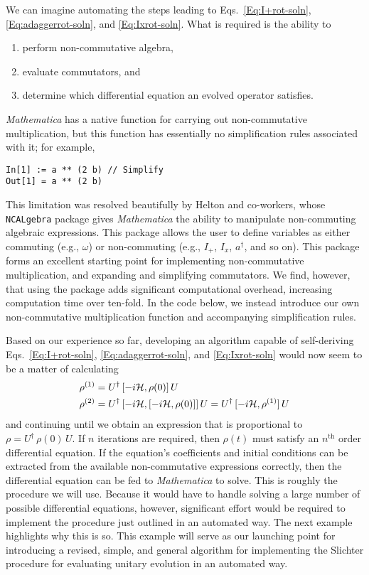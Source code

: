 We can imagine automating the steps leading to Eqs.~\ref{Eq:I+rot-soln}, \ref{Eq:adaggerrot-soln}, and \ref{Eq:Ixrot-soln}.   What is required is the ability to
\begin{enumerate}
  \item perform non-commutative algebra, 
  \item evaluate commutators, and
  \item determine which differential equation an evolved operator satisfies.
\end{enumerate}
\emph{Mathematica} has a native function for carrying out non-commutative multiplication, but this function has essentially no simplification rules associated with it; for example,
\begin{Verbatim}[xleftmargin=0.25in]
In[1] := a ** (2 b) // Simplify
Out[1] = a ** (2 b)
\end{Verbatim}
This limitation was resolved beautifully by Helton and co-workers, whose \verb+NCALgebra+ package \cite{Helton2015feb} gives \emph{Mathematica} the ability to manipulate non-commuting algebraic expressions.  This package allows the user to define variables as either commuting (e.g., $\omega$) or non-commuting (e.g., $I_+$, $I_x$, $a^{\dagger}$, and so on).  This package forms an excellent starting point for implementing non-commutative multiplication, and expanding and simplifying commutators. We find, however, that using the package adds significant computational overhead, increasing computation time over ten-fold.  In the code below, we instead introduce our own non-commutative multiplication function and accompanying simplification rules. 

Based on our experience so far, developing an algorithm capable of self-deriving Eqs.~\ref{Eq:I+rot-soln}, \ref{Eq:adaggerrot-soln}, and \ref{Eq:Ixrot-soln} would now seem to be a matter of calculating
\begin{align}
\rho^{(1)} & = U^{\dagger} \, [-i {\cal H}, \rho(0)] \, U \\
\rho^{(2)} & = U^{\dagger} \, [-i {\cal H}, [-i {\cal H}, \rho(0)]] \, U
	= U^{\dagger} \, [-i {\cal H}, \rho^{(1)}] \, U
\end{align}
and continuing until we obtain an expression that is proportional to $\rho = U^{\dagger} \, \rho(0) \, U$. If $n$ iterations are required, then $\rho(t)$ must satisfy an $n^\text{th}$ order differential equation.  If the equation's coefficients and initial conditions can be extracted from the  available non-commutative expressions correctly, then the differential equation can be fed to \emph{Mathematica} to solve.  This is roughly the procedure we will use.  Because it would have to handle solving a large number of possible differential equations, however, significant effort would be required to implement the procedure just outlined in an automated way.  The next example highlights why this is so.  This example will serve as our launching point for introducing a revised, simple, and general algorithm for implementing the Slichter procedure for evaluating unitary evolution in an automated way. 

